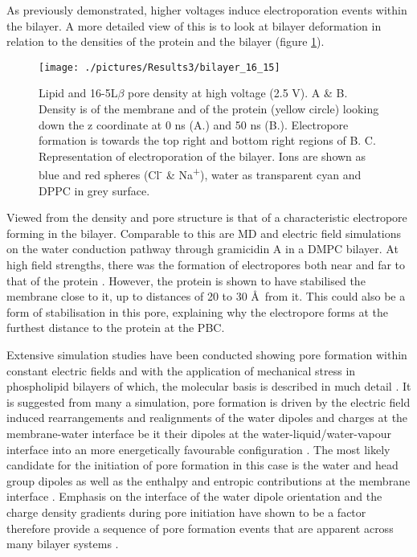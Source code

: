 As previously demonstrated, higher voltages induce electroporation events within the bilayer. A more detailed view of this is to look at bilayer deformation in relation to the densities of the protein and the bilayer (figure \ref{fig:bilayer_16_15}).

\begin{figure}[H]
\begin{center}
\texttt{[image: ./pictures/Results3/bilayer\_16\_15]}
\caption[Lipid and 16-5L$\beta$ pore density at high voltage (2.5 V).] {Lipid and 16-5L$\beta$ pore density at high voltage (2.5 V). A \& B. Density is of the membrane and of the protein (yellow circle) looking down the z coordinate at 0 ns (A.) and 50 ns (B.). Electropore formation is towards the top right and bottom right regions of B. C. Representation of electroporation of the bilayer. Ions are shown as blue and red spheres (Cl\textsuperscript{-} \& Na\textsuperscript{+}), water as transparent cyan and DPPC in grey surface.}
\label{fig:bilayer_16_15}
\end{center}
\end{figure}

Viewed from the density and pore structure is that of a characteristic electropore forming in the bilayer. Comparable to this are MD and electric field simulations on the water conduction pathway through gramicidin A in a DMPC bilayer. At high field strengths, there was the formation of electropores both near and far to that of the protein \cite{Siu2007}. However, the protein is shown to have stabilised the membrane close to it, up to distances of 20 to 30 \AA\ from it. This could also be a form of stabilisation in this pore, explaining why the electropore forms at the furthest distance to the protein at the PBC.

Extensive simulation studies have been conducted showing pore formation within constant electric fields and with the application of mechanical stress in phospholipid bilayers \cite{Tieleman2003} of which, the molecular basis is described in much detail \cite{Tieleman2004,Vernier2007}. It is suggested from many a simulation, pore formation is driven by the electric field induced rearrangements and realignments of the water dipoles and charges at the membrane-water interface be it their dipoles at the water-liquid/water-vapour interface into an more energetically favourable configuration \cite{Vernier2006a,Tokman2013}. The most likely candidate for the initiation of pore formation in this case is the water and head group dipoles as well as the enthalpy and entropic contributions at the membrane interface \cite{Marrink1993,Saiz2002}. Emphasis on the interface of the water dipole orientation and the charge density gradients during pore initiation have shown to be a factor \cite{Tieleman2003,Tieleman2004,Vernier2006} therefore provide a sequence of pore formation events that are apparent across many bilayer systems \cite{Tarek2005,Tieleman2003,Tieleman2004,Vernier2006,Polak2013}.

